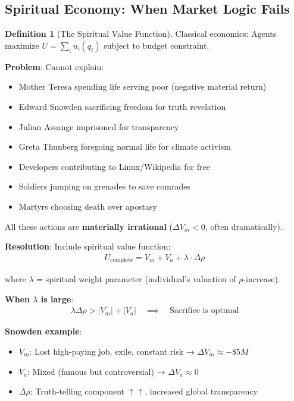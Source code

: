 \documentclass[11pt,a4paper]{article}
\theoremstyle{definition}
\newtheorem{definition}{Definition}[section]
\theoremstyle{remark}
\begin{document}
\begin{small}
\begin{enumerate}
\subsection{Spiritual Economy: When Market Logic Fails}

\begin{definition}[The Spiritual Value Function]
Classical economics: Agents maximize \(U = \sum_i u_i(q_i)\) subject to budget constraint.

\textbf{Problem}: Cannot explain:
\begin{itemize}
    \item Mother Teresa spending life serving poor (negative material return)
    \item Edward Snowden sacrificing freedom for truth revelation
    \item Julian Assange imprisoned for transparency
    \item Greta Thunberg foregoing normal life for climate activism
    \item Developers contributing to Linux/Wikipedia for free
    \item Soldiers jumping on grenades to save comrades
    \item Martyrs choosing death over apostasy
\end{itemize}

All these actions are \textbf{materially irrational} (\(\Delta V_m < 0\), often dramatically).

\textbf{Resolution}: Include spiritual value function:
\begin{align}
U_{\text{complete}} = V_m + V_a + \lambda \cdot \Delta\rho
\end{align}

where \(\lambda\) = spiritual weight parameter (individual's valuation of \(\rho\)-increase).

\textbf{When \(\lambda\) is large}:
\begin{align}
\lambda \Delta\rho > |V_m| + |V_a| \quad \implies \quad \text{Sacrifice is optimal}
\end{align}

\textbf{Snowden example}:
\begin{itemize}
    \item \(V_m\): Lost high-paying job, exile, constant risk → \(\Delta V_m \approx -\$5M\)
    \item \(V_a\): Mixed (famous but controversial) → \(\Delta V_a \approx 0\)
    \item \(\Delta\rho\): Truth-telling component \(\uparrow\uparrow\), increased global transparency
\end{itemize}


\end{definition}
\end{enumerate}
\end{small}
\end{document}
